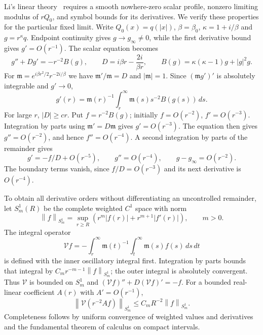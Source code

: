 \documentclass[11pt]{article}
\numberwithin{equation}{section}
\theoremstyle{remark}
\newcommand{\norm}[1]{\left\|#1\right\|}
\begin{document}
Li's linear theory~\cite{Li} requires a smooth nowhere-zero scalar
profile, nonzero limiting modulus of $rQ_0$, and symbol bounds for its
derivatives. We verify these properties for the particular fixed limit.
Write $Q_0(x)=q(|x|)$, $\beta=\beta_0$,
$\kappa=1+i/\beta$ and $g=r^\kappa q$. Endpoint continuity gives
$g\to g_\infty\ne0$, while the first derivative bound gives $g'=O(r^{-1})$.
The scalar equation becomes
\[
 g''+Dg'=-r^{-2}B(g),\qquad
 D=i\beta r-\frac{2i}{\beta r},\qquad
 B(g)=\kappa(\kappa-1)g+|g|^2g.
\]
For $\mathfrak m=e^{i\beta r^2/2}r^{-2i/\beta}$ we have
$\mathfrak m'/\mathfrak m=D$ and $|\mathfrak m|=1$. Since
$(\mathfrak m g')'$ is absolutely integrable and $g'\to0$,
\begin{equation}\label{eq:tail-integral}
 g'(r)=\mathfrak m(r)^{-1}\int_r^\infty
                  \mathfrak m(s)s^{-2}B(g(s))\,ds.
\end{equation}
For large $r$, $|D|\ge cr$. Put $f=r^{-2}B(g)$; initially
$f=O(r^{-2})$, $f'=O(r^{-3})$. Integration by parts using
$\mathfrak m'=D\mathfrak m$ gives $g'=O(r^{-3})$.
The equation then gives $g''=O(r^{-2})$, and hence $f''=O(r^{-4})$.
A second integration by parts of the remainder gives
\[
 g'=-f/D+O(r^{-5}),\qquad g''=O(r^{-4}),\qquad
 g-g_\infty=O(r^{-2}).
\]
The boundary terms vanish, since $f/D=O(r^{-3})$ and its next
derivative is $O(r^{-4})$.

To obtain all derivative orders without differentiating an uncontrolled
remainder, let $S_m^1(R)$ be the complete weighted $C^1$ space with norm
\[
 \norm f_{S_m^1}=\sup_{r\ge R}
            (r^m|f(r)|+r^{m+1}|f'(r)|),\qquad m>0.
\]
The integral operator
\[
 \mathcal V f=-\int_r^\infty\mathfrak m(t)^{-1}
                 \int_t^\infty\mathfrak m(s)f(s)\,ds\,dt
\]
is defined with the inner oscillatory integral first. Integration by parts
bounds that integral by $C_mr^{-m-1}\norm f_{S_m^1}$; the outer integral
is absolutely convergent. Thus $\mathcal V$ is bounded on $S_m^1$ and
$(\mathcal V f)''+D(\mathcal V f)'=-f$.
For a bounded real-linear coefficient $A(r)$ with $A'=O(r^{-1})$,
\begin{equation}\label{eq:volterra-small}
 \norm{\mathcal V(r^{-2}Af)}_{S_m^1}
             \le C_m R^{-2}\norm f_{S_m^1}.
\end{equation}
Completeness follows by uniform convergence of weighted values and
derivatives and the fundamental theorem of calculus on compact intervals.
\end{document}
